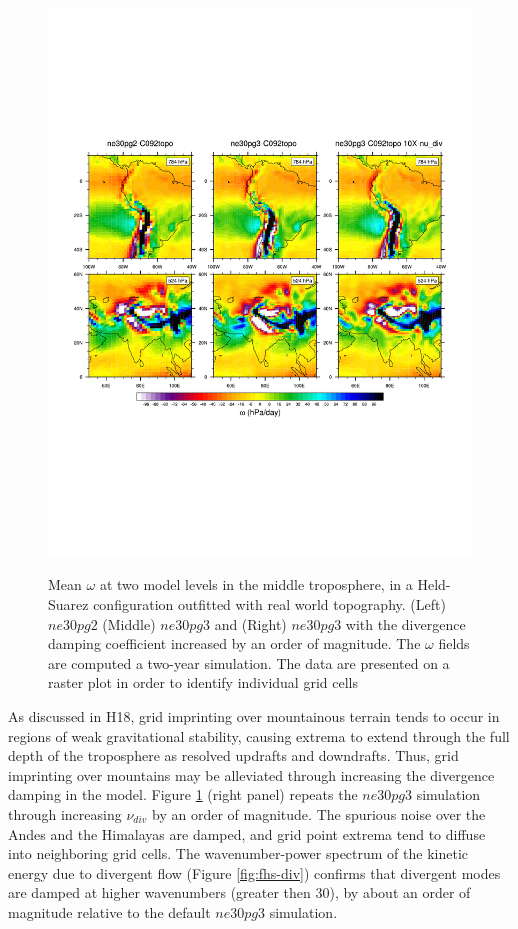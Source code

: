\documentclass{agujournal}
\begin{document}
\begin{figure}[t]
\begin{center}
\noindent\includegraphics[width=30pc,angle=0]{figs/fhstopo_ne30pg2-v-ne30pg3-v-10Xnudiv.pdf}\\
\end{center}
\caption{Mean $\omega$ at two model levels in the middle troposphere, in a Held-Suarez configuration outfitted with real world topography. (Left) $ne30pg2$ (Middle) $ne30pg3$ and (Right) $ne30pg3$ with the divergence damping coefficient increased by an order of magnitude. The $\omega$ fields are computed a two-year simulation. The data are presented on a raster plot in order to identify individual grid cells}
\label{fig:fhs-contours}
\end{figure}

As discussed in H18, grid imprinting over mountainous terrain tends to occur in regions of weak gravitational stability, causing extrema to extend through the full depth of the troposphere as resolved updrafts and downdrafts. Thus, grid imprinting over mountains may be alleviated through increasing the divergence damping in the model. Figure \ref{fig:fhs-contours} (right panel) repeats the $ne30pg3$ simulation through increasing $\nu_{div}$ by an order of magnitude. The spurious noise over the Andes and the Himalayas are damped, and grid point extrema tend to diffuse into neighboring grid cells. The wavenumber-power spectrum of the kinetic energy due to divergent flow (Figure \ref{fig:fhs-div}) confirms that divergent modes are damped at higher wavenumbers (greater then 30), by about an order of magnitude relative to the default $ne30pg3$ simulation.
\end{document}
